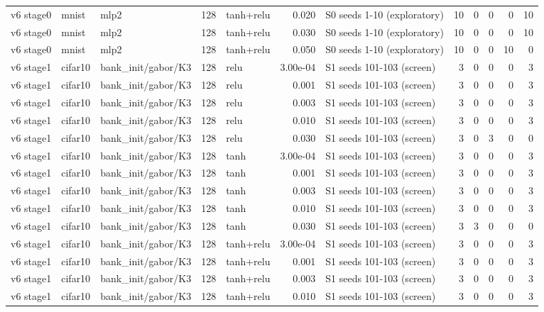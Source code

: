 \begin{table}[htbp]
{\begin{tabular}{@{}lllrlrlrrrrr@{}}
v6 stage0 & mnist & mlp2 & 128 & tanh+relu & 0.020 & S0 seeds 1-10 (exploratory) & 10 & 0 & 0 & 0 & 10 \\
v6 stage0 & mnist & mlp2 & 128 & tanh+relu & 0.030 & S0 seeds 1-10 (exploratory) & 10 & 0 & 0 & 0 & 10 \\
v6 stage0 & mnist & mlp2 & 128 & tanh+relu & 0.050 & S0 seeds 1-10 (exploratory) & 10 & 0 & 0 & 10 & 0 \\
v6 stage1 & cifar10 & bank\_init/gabor/K3 & 128 & relu & 3.00e-04 & S1 seeds 101-103 (screen) & 3 & 0 & 0 & 0 & 3 \\
v6 stage1 & cifar10 & bank\_init/gabor/K3 & 128 & relu & 0.001 & S1 seeds 101-103 (screen) & 3 & 0 & 0 & 0 & 3 \\
v6 stage1 & cifar10 & bank\_init/gabor/K3 & 128 & relu & 0.003 & S1 seeds 101-103 (screen) & 3 & 0 & 0 & 0 & 3 \\
v6 stage1 & cifar10 & bank\_init/gabor/K3 & 128 & relu & 0.010 & S1 seeds 101-103 (screen) & 3 & 0 & 0 & 0 & 3 \\
v6 stage1 & cifar10 & bank\_init/gabor/K3 & 128 & relu & 0.030 & S1 seeds 101-103 (screen) & 3 & 0 & 3 & 0 & 0 \\
v6 stage1 & cifar10 & bank\_init/gabor/K3 & 128 & tanh & 3.00e-04 & S1 seeds 101-103 (screen) & 3 & 0 & 0 & 0 & 3 \\
v6 stage1 & cifar10 & bank\_init/gabor/K3 & 128 & tanh & 0.001 & S1 seeds 101-103 (screen) & 3 & 0 & 0 & 0 & 3 \\
v6 stage1 & cifar10 & bank\_init/gabor/K3 & 128 & tanh & 0.003 & S1 seeds 101-103 (screen) & 3 & 0 & 0 & 0 & 3 \\
v6 stage1 & cifar10 & bank\_init/gabor/K3 & 128 & tanh & 0.010 & S1 seeds 101-103 (screen) & 3 & 0 & 0 & 0 & 3 \\
v6 stage1 & cifar10 & bank\_init/gabor/K3 & 128 & tanh & 0.030 & S1 seeds 101-103 (screen) & 3 & 3 & 0 & 0 & 0 \\
v6 stage1 & cifar10 & bank\_init/gabor/K3 & 128 & tanh+relu & 3.00e-04 & S1 seeds 101-103 (screen) & 3 & 0 & 0 & 0 & 3 \\
v6 stage1 & cifar10 & bank\_init/gabor/K3 & 128 & tanh+relu & 0.001 & S1 seeds 101-103 (screen) & 3 & 0 & 0 & 0 & 3 \\
v6 stage1 & cifar10 & bank\_init/gabor/K3 & 128 & tanh+relu & 0.003 & S1 seeds 101-103 (screen) & 3 & 0 & 0 & 0 & 3 \\
v6 stage1 & cifar10 & bank\_init/gabor/K3 & 128 & tanh+relu & 0.010 & S1 seeds 101-103 (screen) & 3 & 0 & 0 & 0 & 3 \\

\end{tabular}}
\end{table}
